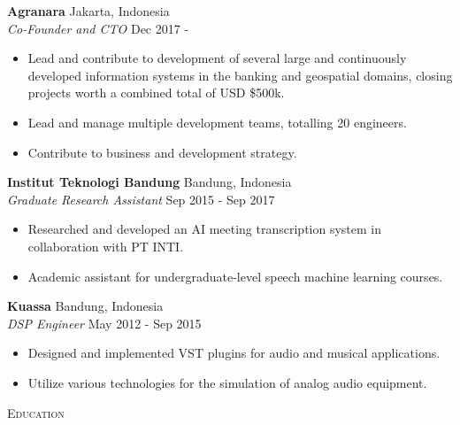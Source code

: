 \documentclass{article}
\newcommand{\lineunder} {
    \vspace*{-8pt} \\
    \hspace*{-18pt} \hrulefill \\
}
\newcommand{\header} [1] {
    {\hspace*{-18pt}\vspace*{6pt} \textsc{#1}}
    \vspace*{-6pt} \lineunder
}
\begin{document}
\textbf{Agranara} \hfill Jakarta, Indonesia\\
\vspace{1mm}
\emph{Co-Founder and CTO} \hfill Dec 2017 -\\
\vspace{-3mm}
\begin{itemize}[align=left, left=0pt..1em, itemsep=-2pt]
  \item Lead and contribute to development of several large and continuously
    developed information systems in the banking and geospatial domains,
    closing projects worth a combined total of USD \$500k.
  \item Lead and manage multiple development teams, totalling 20 engineers.
  \item Contribute to business and development strategy.
\end{itemize}
\vspace{-1mm}

\textbf{Institut Teknologi Bandung} \hfill Bandung, Indonesia\\
\vspace{1mm}
\emph{Graduate Research Assistant} \hfill Sep 2015 - Sep 2017\\
\vspace{-3mm}
\begin{itemize}[align=left, left=0pt..1em, itemsep=-2pt]
  \item Researched and developed an AI meeting transcription system in
    collaboration with PT INTI.
  \item Academic assistant for undergraduate-level speech machine learning courses.
\end{itemize}
\vspace{-1mm}

\textbf{Kuassa} \hfill Bandung, Indonesia\\
\vspace{1mm}
\emph{DSP Engineer} \hfill May 2012 - Sep 2015\\
\vspace{-3mm}
\begin{itemize}[align=left, left=0pt..1em, itemsep=-2pt]
  \item Designed and implemented VST plugins for audio and musical applications.
  \item Utilize various technologies for the simulation of analog audio
    equipment.
\end{itemize}

\header{Education}
\vspace{1mm}
\end{document}
